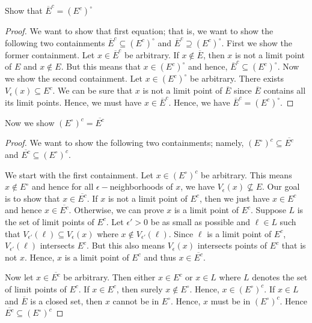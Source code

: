 \begin{enumerate}
        Show that \( \overline{E}^c = (E^c)^{\circ} \)
        \begin{proof}
            We want to show that first equation; that is, we want to show the following two containments \( \overline{E}^c \subseteq (E^c)^{\circ} \) and \( \overline{E}^c \supseteq (E^c)^{\circ} \). 
            First we show the former containment. Let \( x \in \overline{E}^c \) be arbitrary. If \( x \notin \overline{E} \), then \( x  \) is not a limit point of \( E \) and \( x \notin E \).  But this means that \( x \in (E^c)^{\circ} \) and hence, \( \overline{E}^c \subseteq (E^c)^{\circ} \). 
            Now we show the second containment. Let \( x \in (E^c)^{\circ} \) be arbitrary. There exists \( V_{\epsilon }(x) \subseteq E^c \). We can be sure that \( x\) is not a limit point of \( \overline{E} \) since \( \overline{E} \) contains all its limit points. Hence, we must have \( x \in \overline{E}^c \). Hence, we have \( \overline{E}^c = (E^c)^{\circ} \).   
        \end{proof}
        Now we show \( (E^{\circ})^c = \overline{E^c}\)
        \begin{proof}
            We want to show the following two containments; namely, \( (E^{\circ})^c \subseteq \overline{E^c} \) and \( \overline{E^c} \subseteq (E^{\circ})^c \).

            We start with the first containment. Let \( x \in (E^{\circ})^c \) be arbitrary. This means \( x \notin E^{\circ} \) and hence for all \( \epsilon - \)neighborhoods of \( x \), we have \( V_{\epsilon }(x) \not\subseteq E \). Our goal is to show that \( x \in \overline{E^c} \). If \( x  \) is not a limit point of \( E^c \), then we just have \( x \in E^c \) and hence \( x \in \overline{E^c} \). Otherwise, we can prove \( x  \) is a limit point of \( E^c \). Suppose \( L \) is the set of limit points of \( E^c \). Let \( \epsilon' > 0   \) be as small as possible and \( \ell \in L  \) such that \( V_{\epsilon '}(\ell) \subseteq V_{\epsilon }(x) \) where \( x \notin V_{\epsilon'}(\ell) \). Since \( \ell \) is a limit point of \( E^c \), \( V_{\epsilon '}(\ell) \) intersects \( E^c \). But this also means \( V_{\epsilon }(x) \) intersects points of \( E^c \) that is not \( x  \). Hence, \( x  \) is a limit point of \( E^c \) and thus \( x \in \overline{E^c} \).


            Now let \( x \in \overline{E^c} \) be arbitrary. Then either \( x \in E^c \) or \( x \in L  \) where \( L \) denotes the set of limit points of \( E^c \). If \( x \in E^c \), then surely \( x \notin E^{\circ} \). Hence, \( x \in (E^{\circ})^c \). If \( x \in L \) and \( \overline{E} \) is a closed set, then \( x  \) cannot be in \( E^{\circ} \). Hence, \( x \) must be in \( (E^{\circ})^c \). Hence \( \overline{E^c} \subseteq (E^{\circ})^c \)

        \end{proof}
\end{enumerate}













